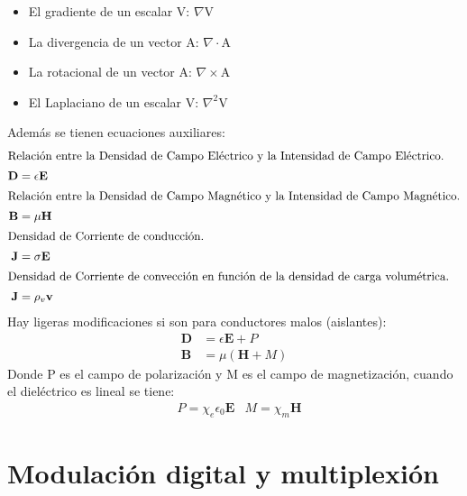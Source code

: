 \documentclass[11pt,fleqn,a4paper,]{LegrandOrangeBook}
\begin{document}
\begin{itemize}
\item El gradiente de un escalar V: $\nabla$V
\item La divergencia de un vector A: $\nabla\cdot$A
\item La rotacional de un vector A: $\nabla\times$A
\item El Laplaciano de un escalar V: $\nabla^2$V
\end{itemize}
Además se tienen ecuaciones auxiliares:
\begin{subequations}
\begin{align}
\intertext{Relación entre la Densidad de Campo Eléctrico y la Intensidad de Campo Eléctrico.}
\textbf{D}&= \epsilon \textbf{E}\\
\intertext{Relación entre la Densidad de Campo Magnético y la Intensidad de Campo Magnético.}
\textbf{B}&=\mu\textbf{H}\\
\intertext{Densidad de Corriente de conducción.}
\textbf{J}&=\sigma\textbf{E}\\
\intertext{Densidad de Corriente de convección en función de la densidad de carga volumétrica.}
\textbf{J}&=\rho_v\textbf{v}
\end{align}
\end{subequations}
Hay ligeras modificaciones si son para conductores malos (aislantes):
\begin{subequations}
\begin{align}
\textbf{D}&= \epsilon \textbf{E} + P\\
\textbf{B}&=\mu(\textbf{H} + M)
\end{align}
\end{subequations}
Donde P es el campo de polarización y M es el campo de magnetización, cuando el dieléctrico es lineal se tiene:
\begin{align*}
&P=\chi_e\epsilon_0\textbf{E} &M=\chi_m\textbf{H}
\end{align*}
\section{Modulación digital y multiplexión}
\end{document}
